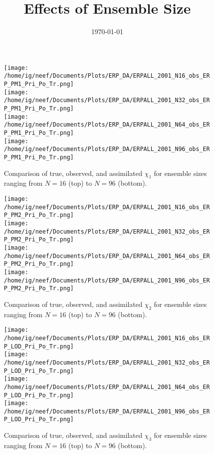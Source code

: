 \documentclass[11pt]{report}
\title{Effects of Ensemble Size}
\date{\today}
\begin{document}


\maketitle

\begin{figure}
  \noindent
  \texttt{[image: /home/ig/neef/Documents/Plots/ERP\_DA/ERPALL\_2001\_N16\_obs\_ERP\_PM1\_Pri\_Po\_Tr.png]} \\
  \texttt{[image: /home/ig/neef/Documents/Plots/ERP\_DA/ERPALL\_2001\_N32\_obs\_ERP\_PM1\_Pri\_Po\_Tr.png]} \\
  \texttt{[image: /home/ig/neef/Documents/Plots/ERP\_DA/ERPALL\_2001\_N64\_obs\_ERP\_PM1\_Pri\_Po\_Tr.png]} \\
  \texttt{[image: /home/ig/neef/Documents/Plots/ERP\_DA/ERPALL\_2001\_N96\_obs\_ERP\_PM1\_Pri\_Po\_Tr.png]} \\
   \caption{Comparison of true, observed, and assimilated $\chi_1$ for ensemble sizes ranging from $N=16$ (top) to $N=96$ (bottom).}
   \label{fig:ERP_PM1}
 \end{figure}

\begin{figure}
  \noindent
  \texttt{[image: /home/ig/neef/Documents/Plots/ERP\_DA/ERPALL\_2001\_N16\_obs\_ERP\_PM2\_Pri\_Po\_Tr.png]} \\
  \texttt{[image: /home/ig/neef/Documents/Plots/ERP\_DA/ERPALL\_2001\_N32\_obs\_ERP\_PM2\_Pri\_Po\_Tr.png]} \\
  \texttt{[image: /home/ig/neef/Documents/Plots/ERP\_DA/ERPALL\_2001\_N64\_obs\_ERP\_PM2\_Pri\_Po\_Tr.png]} \\
  \texttt{[image: /home/ig/neef/Documents/Plots/ERP\_DA/ERPALL\_2001\_N96\_obs\_ERP\_PM2\_Pri\_Po\_Tr.png]} \\
   \caption{Comparison of true, observed, and assimilated $\chi_2$ for ensemble sizes ranging from $N=16$ (top) to $N=96$ (bottom).}
   \label{fig:ERP_PM2}
 \end{figure}

\begin{figure}
  \noindent
  \texttt{[image: /home/ig/neef/Documents/Plots/ERP\_DA/ERPALL\_2001\_N16\_obs\_ERP\_LOD\_Pri\_Po\_Tr.png]} \\
  \texttt{[image: /home/ig/neef/Documents/Plots/ERP\_DA/ERPALL\_2001\_N32\_obs\_ERP\_LOD\_Pri\_Po\_Tr.png]} \\
  \texttt{[image: /home/ig/neef/Documents/Plots/ERP\_DA/ERPALL\_2001\_N64\_obs\_ERP\_LOD\_Pri\_Po\_Tr.png]} \\
  \texttt{[image: /home/ig/neef/Documents/Plots/ERP\_DA/ERPALL\_2001\_N96\_obs\_ERP\_LOD\_Pri\_Po\_Tr.png]} \\
   \caption{Comparison of true, observed, and assimilated $\chi_3$ for ensemble sizes ranging from $N=16$ (top) to $N=96$ (bottom).}
   \label{fig:ERP_LOD}
 \end{figure}
\end{document}
